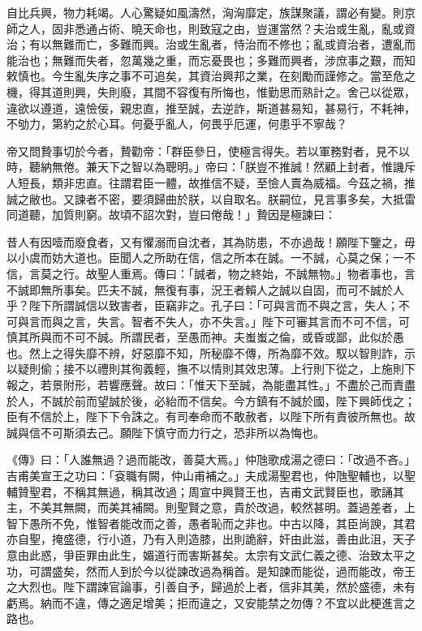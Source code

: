 \begin{pinyinscope}
 自比兵興，物力耗竭。人心驚疑如風濤然，洶洶靡定，族謀聚議，謂必有變。則京師之人，固非悉通占術、曉天命也，則致寇之由，豈運當然？夫治或生亂，亂或資治；有以無難而亡，多難而興。治或生亂者，恃治而不修也；亂或資治者，遭亂而能治也；無難而失者，忽萬幾之重，而忘憂畏也；多難而興者，涉庶事之艱，而知敕慎也。今生亂失序之事不可追矣，其資治興邦之業，在刻勵而謹修之。當至危之機，得其道則興，失則廢，其間不容復有所悔也，惟勤思而熟計之。舍己以從眾，違欲以遵道，遠憸佞，親忠直，推至誠，去逆詐，斯道甚易知，甚易行，不耗神，不劬力，第約之於心耳。何憂乎亂人，何畏乎厄運，何患乎不寧哉？



 帝又問贄事切於今者，贄勸帝：「群臣參日，使極言得失。若以軍務對者，見不以時，聽納無倦。兼天下之智以為聰明。」帝曰：「朕豈不推誠！然顧上封者，惟譏斥人短長，類非忠直。往謂君臣一體，故推信不疑，至憸人賣為威福。今茲之禍，推誠之敝也。又諫者不密，要須歸曲於朕，以自取名。朕嗣位，見言事多矣，大抵雷同道聽，加質則窮。故頃不詔次對，豈曰倦哉！」贄因是極諫曰：



 昔人有因噎而廢食者，又有懼溺而自沈者，其為防患，不亦過哉！願陛下鑒之，毋以小虞而妨大道也。臣聞人之所助在信，信之所本在誠。一不誠，心莫之保；一不信，言莫之行。故聖人重焉。傳曰：「誠者，物之終始，不誠無物。」物者事也，言不誠即無所事矣。匹夫不誠，無復有事，況王者賴人之誠以自固，而可不誠於人乎？陛下所謂誠信以致害者，臣竊非之。孔子曰：「可與言而不與之言，失人；不可與言而與之言，失言。智者不失人，亦不失言。」陛下可審其言而不可不信，可慎其所與而不可不誠。所謂民者，至愚而神。夫蚩蚩之倫，或昏或鄙，此似於愚也。然上之得失靡不辨，好惡靡不知，所秘靡不傳，所為靡不效。馭以智則詐，示以疑則偷；接不以禮則其徇義輕，撫不以情則其效忠薄。上行則下從之，上施則下報之，若景附形，若響應聲。故曰：「惟天下至誠，為能盡其性。」不盡於己而責盡於人，不誠於前而望誠於後，必紿而不信矣。今方鎮有不誠於國，陛下興師伐之；臣有不信於上，陛下下令誅之。有司奉命而不敢赦者，以陛下所有責彼所無也。故誠與信不可斯須去己。願陛下慎守而力行之，恐非所以為悔也。



 《傳》曰：「人誰無過？過而能改，善莫大焉。」仲虺歌成湯之德曰：「改過不吝。」吉甫美宣王之功曰：「袞職有闕，仲山甫補之。」夫成湯聖君也，仲虺聖輔也，以聖輔贊聖君，不稱其無過，稱其改過；周宣中興賢王也，吉甫文武賢臣也，歌誦其主，不美其無闕，而美其補闕。則聖賢之意，貴於改過，較然甚明。蓋過差者，上智下愚所不免，惟智者能改而之善，愚者恥而之非也。中古以降，其臣尚諛，其君亦自聖，掩盛德，行小道，乃有入則造膝，出則詭辭，奸由此滋，善由此沮，天子意由此惑，爭臣罪由此生，媚道行而害斯甚矣。太宗有文武仁義之德、治致太平之功，可謂盛矣，然而人到於今以從諫改過為稱首。是知諫而能從，過而能改，帝王之大烈也。陛下謂諫官論事，引善自予，歸過於上者，信非其美，然於盛德，未有虧焉。納而不違，傳之適足增美；拒而違之，又安能禁之勿傳？不宜以此梗進言之路也。




\end{pinyinscope}
